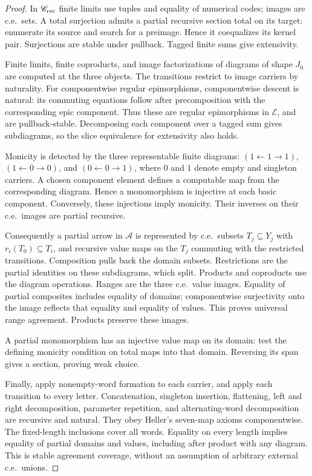 \documentclass[11pt]{article}
\newcommand{\E}{\mathscr E}
\newcommand{\A}{\mathscr A}
\newcommand{\C}{\mathscr C}
\begin{document}
\begin{proof}
In $\C_{\rm rec}$ finite limits use tuples and equality of
numerical codes; images are c.e.\ sets. A total surjection admits a
partial recursive section total on its target: enumerate its source
and search for a preimage. Hence it coequalizes its kernel pair.
Surjections are stable under pullback. Tagged finite sums give
extensivity.

Finite limits, finite coproducts, and image factorizations of
diagrams of shape $J_0$ are computed at the three objects.
The transitions restrict to image carriers by naturality.
For componentwise regular epimorphisms, componentwise descent is
natural: its commuting equations follow after precomposition with
the corresponding epic component. Thus these are regular
epimorphisms in $\E$, and are pullback-stable.
Decomposing each component over a tagged sum gives subdiagrams,
so the slice equivalence for extensivity also holds.

Monicity is detected by the three representable finite diagrams:
$(1\leftarrow1\to1)$, $(1\leftarrow0\to0)$, and
$(0\leftarrow0\to1)$, where $0$ and $1$ denote empty and singleton carriers.
A chosen component element defines a computable map from the
corresponding diagram. Hence a monomorphism is injective at
each basic component. Conversely, these injections imply
monicity. Their inverses on their c.e.\ images are partial recursive.

Consequently a partial arrow in $\A$ is represented by c.e.\
subsets $T_j\subseteq Y_j$ with $r_i(T_0)\subseteq T_i$,
and recursive value maps on the $T_j$ commuting with the
restricted transitions. Composition pulls back the domain subsets.
Restrictions are the partial identities on these subdiagrams,
which split. Products and coproducts use the diagram operations.
Ranges are the three c.e.\ value images. Equality of partial
composites includes equality of domains; componentwise surjectivity
onto the image reflects that equality and equality of values.
This proves universal range agreement. Products preserve these
images.

A partial monomorphism has an injective value map on its domain:
test the defining monicity condition on total maps into that domain.
Reversing its span gives a section, proving weak choice.

Finally, apply nonempty-word formation to each carrier, and apply
each transition to every letter. Concatenation, singleton insertion,
flattening, left and right decomposition, parameter repetition,
and alternating-word decomposition are recursive and natural.
They obey Heller's seven-map axioms componentwise.
The fixed-length inclusions cover all words. Equality on every
length implies equality of partial domains and values, including
after product with any diagram. This is stable agreement coverage,
without an assumption of arbitrary external c.e.\ unions.
\end{proof}
\end{document}
